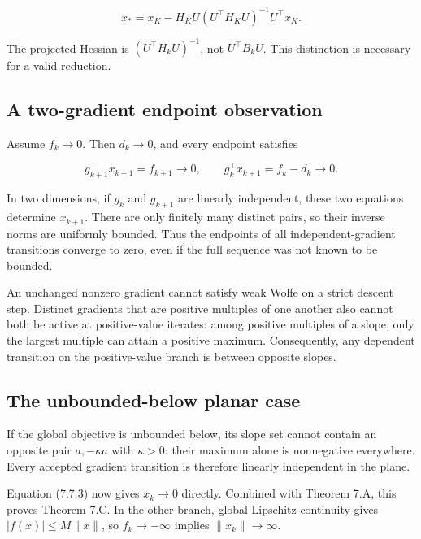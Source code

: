 \[
\boxed{x_*=x_K-H_KU(U^\top H_KU)^{-1}U^\top x_K.}
\tag{7.7.2}
\]

The projected Hessian is \((U^\top H_kU)^{-1}\), not \(U^\top B_kU\).
This distinction is necessary for a valid reduction.



\subsection{A two-gradient endpoint
observation}\label{H:a-two-gradient-endpoint-observation}

Assume \(f_k\to0\). Then \(d_k\to0\), and every endpoint satisfies

\[
g_{k+1}^\top x_{k+1}=f_{k+1}\longrightarrow0,
\qquad
g_k^\top x_{k+1}=f_k-d_k\longrightarrow0.
\tag{7.7.3}
\]

In two dimensions, if \(g_k\) and \(g_{k+1}\) are linearly independent,
these two equations determine \(x_{k+1}\). There are only finitely many
distinct pairs, so their inverse norms are uniformly bounded. Thus the
endpoints of all independent-gradient transitions converge to zero, even
if the full sequence was not known to be bounded.

An unchanged nonzero gradient cannot satisfy weak Wolfe on a strict
descent step. Distinct gradients that are positive multiples of one
another also cannot both be active at positive-value iterates: among
positive multiples of a slope, only the largest multiple can attain a
positive maximum. Consequently, any dependent transition on the
positive-value branch is between opposite slopes.



\subsection{The unbounded-below planar
case}\label{H:the-unbounded-below-planar-case}

If the global objective is unbounded below, its slope set cannot contain
an opposite pair \(a,-\kappa a\) with \(\kappa>0\): their maximum alone
is nonnegative everywhere. Every accepted gradient transition is
therefore linearly independent in the plane.

Equation (7.7.3) now gives \(x_k\to0\) directly. Combined with Theorem 7.A,
this proves Theorem 7.C. In the other branch, global Lipschitz continuity
gives \(|f(x)|\le M\|x\|\), so \(f_k\to-\infty\) implies
\(\|x_k\|\to\infty\).

